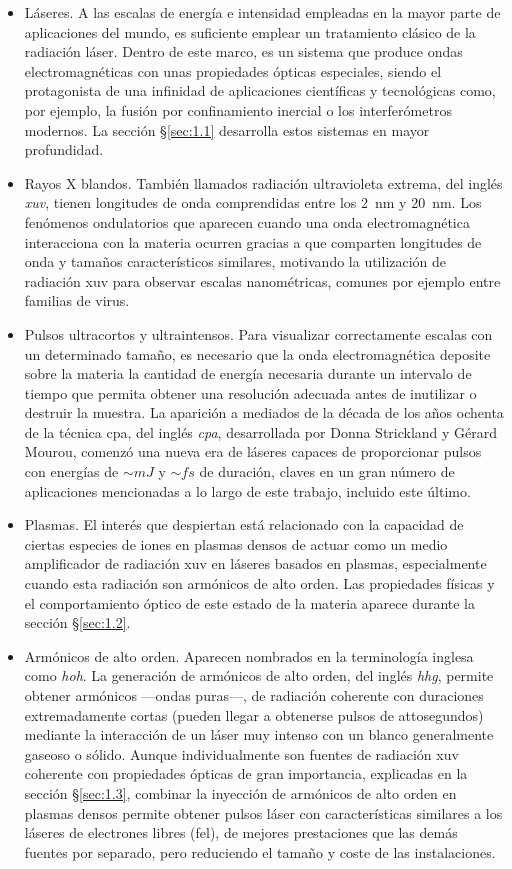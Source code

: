 \begin{itemize}
  \item Láseres. A las escalas de energía e intensidad empleadas en la mayor parte de aplicaciones del mundo, es suficiente emplear un tratamiento clásico de la radiación láser. Dentro de este marco, es un sistema que produce ondas electromagnéticas con unas propiedades ópticas especiales, siendo el protagonista de una infinidad de aplicaciones científicas y tecnológicas como, por ejemplo, la fusión por confinamiento inercial o los interferómetros modernos. La sección \S\ref{sec:1.1} desarrolla estos sistemas en mayor profundidad.
  \item Rayos X blandos. También llamados radiación ultravioleta extrema, del inglés \emph{\acrfull{xuv}}, tienen longitudes de onda comprendidas entre los \qty{2}{nm} y \qty{20}{nm}. Los fenómenos ondulatorios que aparecen cuando una onda electromagnética interacciona con la materia ocurren gracias a que comparten longitudes de onda y tamaños característicos similares, motivando la utilización de radiación \acrshort{xuv} para observar escalas nanométricas, comunes por ejemplo entre familias de virus.
  \item Pulsos ultracortos y ultraintensos. Para visualizar correctamente escalas con un determinado tamaño, es necesario que la onda electromagnética deposite sobre la materia la cantidad de energía necesaria durante un intervalo de tiempo que permita obtener una resolución adecuada antes de inutilizar o destruir la muestra. La aparición a mediados de la década de los años ochenta de la técnica \acrshort{cpa}, del inglés \emph{\acrlong{cpa}}, desarrollada por Donna Strickland y Gérard Mourou\autocite{Strickland1985}, comenzó una nueva era de láseres capaces de proporcionar pulsos con energías de $\sim\unit{mJ}$ y $\sim\unit{fs}$ de duración, claves en un gran número de aplicaciones mencionadas a lo largo de este trabajo, incluido este último.
  \item Plasmas. El interés que despiertan está relacionado con la capacidad de ciertas especies de iones en plasmas densos de actuar como un medio amplificador de radiación \acrshort{xuv} en láseres basados en plasmas, especialmente cuando esta radiación son armónicos de alto orden. Las propiedades físicas y el comportamiento óptico de este estado de la materia aparece durante la sección \S\ref{sec:1.2}. 
  \item Armónicos de alto orden. Aparecen nombrados en la terminología inglesa como \emph{\acrfull{hoh}}. La generación de armónicos de alto orden, del inglés \emph{\acrfull{hhg}}, permite obtener armónicos ---ondas puras---, de radiación coherente con duraciones extremadamente cortas (pueden llegar a obtenerse pulsos de attosegundos) mediante la interacción de un láser muy intenso con un blanco generalmente gaseoso o sólido. Aunque individualmente son fuentes de radiación \acrshort{xuv} coherente con propiedades ópticas de gran importancia, explicadas en la sección \S\ref{sec:1.3}, combinar la inyección de armónicos de alto orden en plasmas densos permite obtener pulsos láser con características similares a los láseres de electrones libres (\acrshort{fel}), de mejores prestaciones que las demás fuentes por separado, pero reduciendo el tamaño y coste de las instalaciones. 

\end{itemize}
